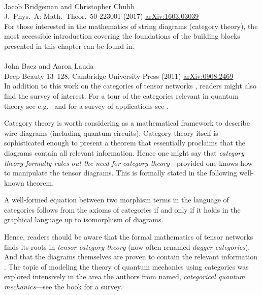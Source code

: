  \cite{2016arXiv160303039B}\\
Jacob Bridgeman and Christopher Chubb \\
J.~Phys.~A: Math.~Theor.~50 223001 (2017)
\href{https://arxiv.org/abs/1603.03039}{arXiv:1603.03039}\\

For those interested in the mathematics of string diagrams (category theory), the most accessible introduction covering the foundations of the building blocks presented in this chapter can be found in. \\

 \cite{Baez}\\
John Baez and Aaron Lauda\\
Deep Beauty 13–128, Cambridge University Press (2011) \href{https://arxiv.org/abs/0908.2469}{arXiv:0908.2469} \\

In addition to this work on the categories of tensor networks \cite{Baez}, readers might also find the survey \cite{catQM} of interest.  For a tour of the categories relevant in quantum theory see e.g.~\cite{0198739613} and for a survey of applications see \cite{Coecke2017}. 

Category theory is worth considering as a mathematical framework to describe wire diagrams (including quantum circuits).  Category theory itself is sophisticated enough to present a theorem that essentially proclaims that the diagrams contain {all} relevant information.  Hence one might say that {\it category theory formally rules out the need for category theory}---provided one knows how to manipulate the tensor diagrams. This is formally stated in the following well-known theorem. 

\begin{theorem} A well-formed equation between two morphism terms in the language of categories follows from the axioms of categories if and only if it holds in the graphical language up to isomorphism of diagrams.
\end{theorem}

Hence, readers should be aware that the formal mathematics of tensor networks finds its roots in {\it tensor category theory} (now often renamed {\it dagger categories}). And that the diagrams themselves are proven to contain the relevant information \cite{Selinger_2010}. The topic of modeling the theory of quantum mechanics using categories was explored intensively in the area the authors from \cite{catQM} named, {\it categorical quantum mechanics}---see the book \cite{Coecke2017} for a survey. 

